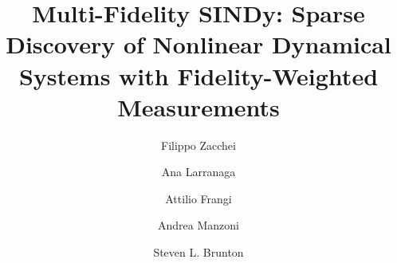 \documentclass[final,3p,10.5pt]{elsarticle}
\begin{document}
\begin{frontmatter}

\title{Multi-Fidelity SINDy: Sparse Discovery of Nonlinear Dynamical Systems with Fidelity-Weighted Measurements}


\author[aff1]{Filippo Zacchei}

\author[aff2]{Ana Larranaga}

\author[aff3]{Attilio Frangi}

\author[aff1]{Andrea Manzoni}

\author[aff4]{Steven L. Brunton}

\address[aff1]{Politecnico di Milano, MOX - Dept. of Mathematics, p.za Leonardo da Vinci, 32, Milano, 20133, Italy}
\address[aff2]{AI Institute in Dynamic Systems, University of Washington, Seattle, USA}
\address[aff3]{Politecnico di Milano, Dept. of Civil and Environmental Engineering, p.za Leonardo da Vinci, 32, Milano, 20133, Italy}
\address[aff4]{Department of Mechanical Engineering, University of Washington, Seattle, Washington 98195, USA}





\end{frontmatter}







\end{document}
